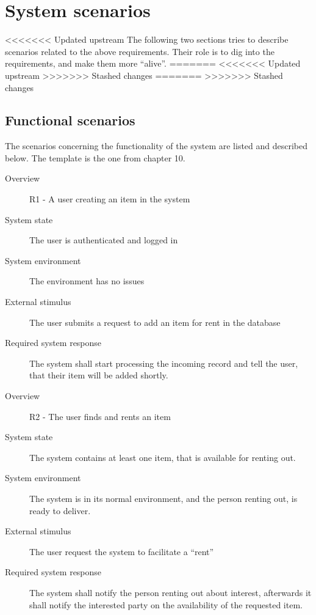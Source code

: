 \documentclass[a4paper,11pt]{report}
\begin{document}
\section{System scenarios}
\label{sec:system-scenarios}
<<<<<<< Updated upstream
The following two sections tries to describe scenarios related to the above
requirements. Their role is to dig into the requirements, and make them more
``alive''.
=======
<<<<<<< Updated upstream
>>>>>>> Stashed changes
=======
>>>>>>> Stashed changes


\subsection{Functional scenarios}
\label{sec:functional-scenarios}
The scenarios concerning the functionality of the system are listed and
described below. The template is the one from \cite{rozanski2011software}
chapter 10.

\begin{description}
    \item[Overview] R1 - A user creating an item in the system
    \item[System state] The user is authenticated and logged in
    \item[System environment] The environment has no issues
    \item[External stimulus] The user submits a request to add an item for rent
        in the database
    \item[Required system response] The system shall start processing the
        incoming record and tell the user, that their item will be added
        shortly.
\end{description}

\begin{description}
    \item[Overview] R2 - The user finds and rents an item
    \item[System state] The system contains at least one item, that is
        available for renting out.
    \item[System environment] The system is in its normal environment, and the
        person renting out, is ready to deliver.
    \item[External stimulus] The user request the system to facilitate a
        ``rent''
    \item[Required system response] The system shall notify the person renting
        out about interest, afterwards it shall notify the interested party on
        the availability of the requested item.
\end{description}
\end{document}
